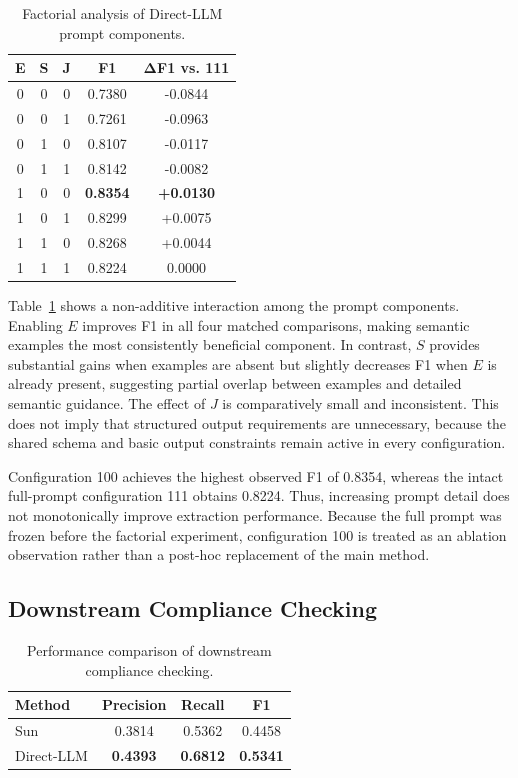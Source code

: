 \documentclass[conference]{IEEEtran}
\begin{document}
\begin{table}[t]
\centering
\caption{Factorial analysis of Direct-LLM prompt components.}
\label{tab:prompt_analysis}
\begin{tabular}{ccc cc}
\toprule
\textbf{E} & \textbf{S} & \textbf{J} & \textbf{F1} & \(\boldsymbol{\Delta}\)\textbf{F1 vs. 111} \\
\midrule
0 & 0 & 0 & 0.7380 & -0.0844 \\
0 & 0 & 1 & 0.7261 & -0.0963 \\
0 & 1 & 0 & 0.8107 & -0.0117 \\
0 & 1 & 1 & 0.8142 & -0.0082 \\
1 & 0 & 0 & \textbf{0.8354} & \textbf{+0.0130} \\
1 & 0 & 1 & 0.8299 & +0.0075 \\
1 & 1 & 0 & 0.8268 & +0.0044 \\
1 & 1 & 1 & 0.8224 & 0.0000 \\
\bottomrule
\end{tabular}
\end{table}

Table~\ref{tab:prompt_analysis} shows a non-additive interaction among the prompt components. Enabling \(E\) improves F1 in all four matched comparisons, making semantic examples the most consistently beneficial component. In contrast, \(S\) provides substantial gains when examples are absent but slightly decreases F1 when \(E\) is already present, suggesting partial overlap between examples and detailed semantic guidance. The effect of \(J\) is comparatively small and inconsistent. This does not imply that structured output requirements are unnecessary, because the shared schema and basic output constraints remain active in every configuration.

Configuration 100 achieves the highest observed F1 of 0.8354, whereas the intact full-prompt configuration 111 obtains 0.8224. Thus, increasing prompt detail does not monotonically improve extraction performance. Because the full prompt was frozen before the factorial experiment, configuration 100 is treated as an ablation observation rather than a post-hoc replacement of the main method.

\subsection{Downstream Compliance Checking}
\label{sec:5.4}

\begin{table}[t]
\centering
\caption{Performance comparison of downstream compliance checking.}
\label{tab:downstream_results}
\begin{tabular}{lccc}
\toprule
\textbf{Method} & \textbf{Precision} & \textbf{Recall} & \textbf{F1} \\
\midrule
Sun & 0.3814 & 0.5362 & 0.4458 \\
Direct-LLM & \textbf{0.4393} & \textbf{0.6812} & \textbf{0.5341} \\
\bottomrule
\end{tabular}
\end{table}
\end{document}
